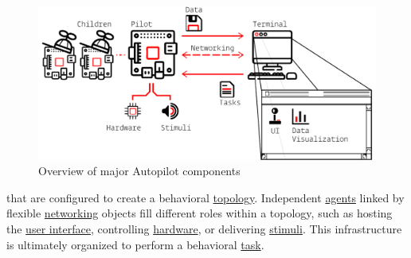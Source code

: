 
\begin{figure}
\includegraphics[]{figures/whole_system_black.pdf}
\caption{Overview of major Autopilot components}
\end{figure}

 that are configured to create a behavioral \hyperref[sec:topology]{topology}. Independent \hyperref[sec:agents]{agents} linked by flexible \hyperref[sec:networking]{networking} objects fill different roles within a topology, such as hosting the \hyperref[sec:ui]{user interface}, controlling \hyperref[sec:hardware]{hardware}, or delivering \hyperref[sec:stim]{stimuli}. This infrastructure is ultimately organized to perform a behavioral \hyperref[sec:tasks]{task}.
